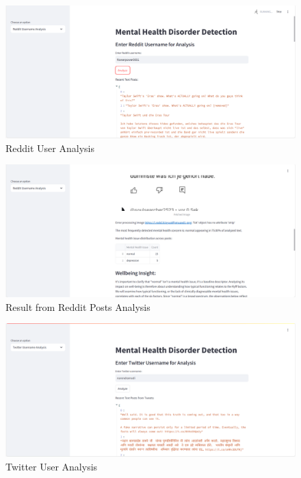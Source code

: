 \pagebreak

\begin{figure}[h!]  
    \centering
    \includegraphics[width=1.0\textwidth]{App Images/06 Interface.png}  
    \caption{Reddit User Analysis}
    \label{07i}  %
\end{figure}

\begin{figure}[h!]  
    \centering
    \includegraphics[width=1.0\textwidth]{App Images/07 Interface.png}  
    \caption{Result from Reddit Posts Analysis}
    \label{08i}  %
\end{figure}

\pagebreak

\begin{figure}[h!]  
    \centering
    \includegraphics[width=1.0\textwidth]{App Images/08 Interface.png}  
    \caption{Twitter User Analysis}
    \label{09i}  %
\end{figure}

